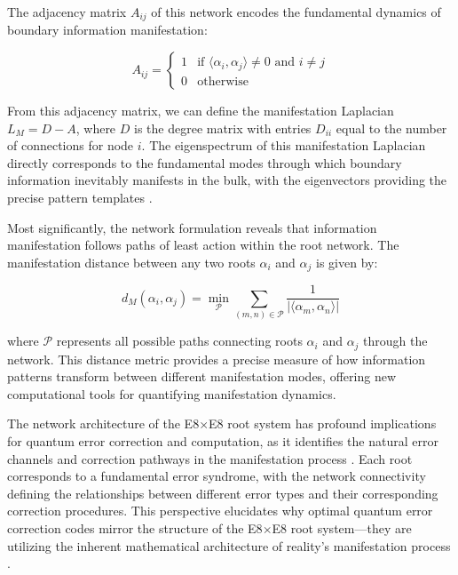 \documentclass[11pt,english,twoside]{article}
\theoremstyle{plain}
\theoremstyle{definition}
\theoremstyle{remark}
\begin{document}
The adjacency matrix $A_{ij}$ of this network encodes the fundamental dynamics of boundary information manifestation:

\begin{equation}
A_{ij} = 
\begin{cases}
1 & \text{if } \langle\alpha_i,\alpha_j\rangle \neq 0 \text{ and } i \neq j \\
0 & \text{otherwise}
\end{cases}
\end{equation}

From this adjacency matrix, we can define the manifestation Laplacian $L_M = D - A$, where $D$ is the degree matrix with entries $D_{ii}$ equal to the number of connections for node $i$. The eigenspectrum of this manifestation Laplacian directly corresponds to the fundamental modes through which boundary information inevitably manifests in the bulk, with the eigenvectors providing the precise pattern templates \cite{Bianconi2021}.

Most significantly, the network formulation reveals that information manifestation follows paths of least action within the root network. The manifestation distance between any two roots $\alpha_i$ and $\alpha_j$ is given by:

\begin{equation}
d_M(\alpha_i, \alpha_j) = \min_{\mathcal{P}} \sum_{(m,n) \in \mathcal{P}} \frac{1}{|\langle\alpha_m,\alpha_n\rangle|}
\end{equation}

where $\mathcal{P}$ represents all possible paths connecting roots $\alpha_i$ and $\alpha_j$ through the network. This distance metric provides a precise measure of how information patterns transform between different manifestation modes, offering new computational tools for quantifying manifestation dynamics.

The network architecture of the E8$\times$E8 root system has profound implications for quantum error correction and computation, as it identifies the natural error channels and correction pathways in the manifestation process \cite{Pastawski2015}. Each root corresponds to a fundamental error syndrome, with the network connectivity defining the relationships between different error types and their corresponding correction procedures. This perspective elucidates why optimal quantum error correction codes mirror the structure of the E8$\times$E8 root system—they are utilizing the inherent mathematical architecture of reality's manifestation process \cite{Hartnett2020}.
\end{document}
